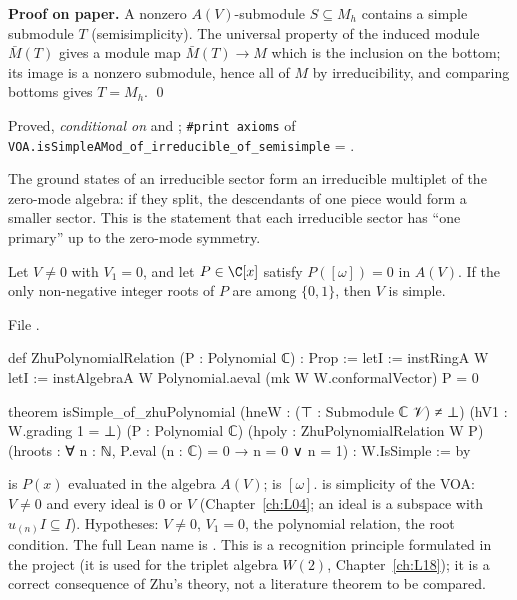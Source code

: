 \textbf{Proof on paper.} A nonzero $A(V)$-submodule $S\subseteq M_h$ contains a simple submodule $T$ (semisimplicity).
The universal property of the induced module $\bar M(T)$ gives a module map $\bar M(T)\to M$ which is the inclusion on the
bottom; its image is a nonzero submodule, hence all of $M$ by irreducibility, and comparing bottoms gives $T = M_h$. \qed

\begin{status}
Proved, \emph{conditional on}  and ; \texttt{\#print axioms} of
\texttt{VOA.\allowbreak isSimpleAMod\_\allowbreak of\_\allowbreak irreducible\_\allowbreak of\_\allowbreak semisimple} = .
\end{status}

\begin{physics}
The ground states of an irreducible sector form an irreducible multiplet of the zero-mode algebra: if they split, the
descendants of one piece would form a smaller sector. This is the statement that each irreducible sector has
``one primary'' up to the zero-mode symmetry.
\end{physics}

\begin{theorem}\label{l12:thm:zhupoly}
Let $V\neq0$ with $V_1 = 0$, and let $P\in\C[x]$ satisfy $P([\omega]) = 0$ in $A(V)$. If the only non-negative
integer roots of $P$ are among $\{0,1\}$, then $V$ is simple.
\end{theorem}
\noindent File .
\begin{leancode}
def ZhuPolynomialRelation (P : Polynomial ℂ) : Prop :=
  letI := instRingA W
  letI := instAlgebraA W
  Polynomial.aeval (mk W W.conformalVector) P = 0

theorem isSimple_of_zhuPolynomial
    (hneW : (⊤ : Submodule ℂ 𝒱) ≠ ⊥)
    (hV1 : W.grading 1 = ⊥)
    (P : Polynomial ℂ)
    (hpoly : ZhuPolynomialRelation W P)
    (hroots : ∀ n : ℕ, P.eval (n : ℂ) = 0 → n = 0 ∨ n = 1) :
    W.IsSimple := by
\end{leancode}

\begin{dictionary}
 is $P(x)$ evaluated in the algebra $A(V)$;  is $[\omega]$.
 is simplicity of the VOA: $V\neq0$ and every ideal is $0$ or $V$ (Chapter~\ref{ch:L04};
an ideal  is a subspace with $u_{(n)}I\subseteq I$). Hypotheses: $V\neq0$, $V_1 = 0$, the
polynomial relation, the root condition. The full Lean name is
\allowbreak{}\allowbreak{}\allowbreak{}\allowbreak{}. This is a recognition principle formulated in the
project (it is used for the triplet algebra $W(2)$, Chapter~\ref{ch:L18}); it is a correct consequence of Zhu's
theory, not a literature theorem to be compared.
\end{dictionary}

